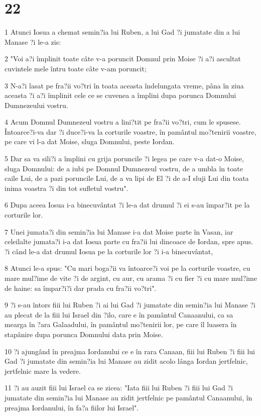 \chapter{22}

\par 1 Atunci Iosua a chemat semin?ia lui Ruben, a lui Gad ?i jumatate din a lui Manase ?i le-a zis:
\par 2 "Voi a?i împlinit toate câte v-a poruncit Domnul prin Moise ?i a?i ascultat cuvintele mele întru toate câte v-am poruncit;
\par 3 N-a?i lasat pe fra?ii vo?tri în toata aceasta îndelungata vreme, pâna în ziua aceasta ?i a?i împlinit cele ce se cuvenea a împlini dupa porunca Domnului Dumnezeului vostru.
\par 4 Acum Domnul Dumnezeul vostru a lini?tit pe fra?ii vo?tri, cum le spusese. Întoarce?i-va dar ?i duce?i-va la corturile voastre, în pamântul mo?tenirii voastre, pe care vi l-a dat Moise, sluga Domnului, peste Iordan.
\par 5 Dar sa va sili?i a împlini cu grija poruncile ?i legea pe care v-a dat-o Moise, sluga Domnului: de a iubi pe Domnul Dumnezeul vostru, de a umbla în toate caile Lui, de a pazi poruncile Lui, de a va lipi de El ?i de a-I sluji Lui din toata inima voastra ?i din tot sufletul vostru".
\par 6 Dupa aceea Iosua i-a binecuvântat ?i le-a dat drumul ?i ei s-au împar?it pe la corturile lor.
\par 7 Unei jumata?i din semin?ia lui Manase i-a dat Moise parte în Vasan, iar celeilalte jumata?i i-a dat Iosua parte cu fra?ii lui dincoace de Iordan, spre apus. ?i când le-a dat drumul Iosua pe la corturile lor ?i i-a binecuvântat,
\par 8 Atunci le-a spus: "Cu mari boga?ii va întoarce?i voi pe la corturile voastre, cu mare mul?ime de vite ?i de argint, cu aur, cu arama ?i cu fier ?i cu mare mul?ime de haine: sa împar?i?i dar prada cu fra?ii vo?tri".
\par 9 ?i s-au întors fiii lui Ruben ?i ai lui Gad ?i jumatate din semin?ia lui Manase ?i au plecat de la fiii lui Israel din ?ilo, care e în pamântul Canaanului, ca sa mearga în ?ara Galaadului, în pamântul mo?tenirii lor, pe care îl luasera în stapânire dupa porunca Domnului data prin Moise.
\par 10 ?i ajungând în preajma Iordanului ce e în rara Canaan, fiii lui Ruben ?i fiii lui Gad ?i jumatate din semin?ia lui Manase au zidit acolo lânga Iordan jertfelnic, jertfelnic mare la vedere.
\par 11 ?i au auzit fiii lui Israel ca se zicea: "Iata fiii lui Ruben ?i fiii lui Gad ?i jumatate din semin?ia lui Manase au zidit jertfelnic pe pamântul Canaanului, în preajma Iordanului, în fa?a fiilor lui Israel".
